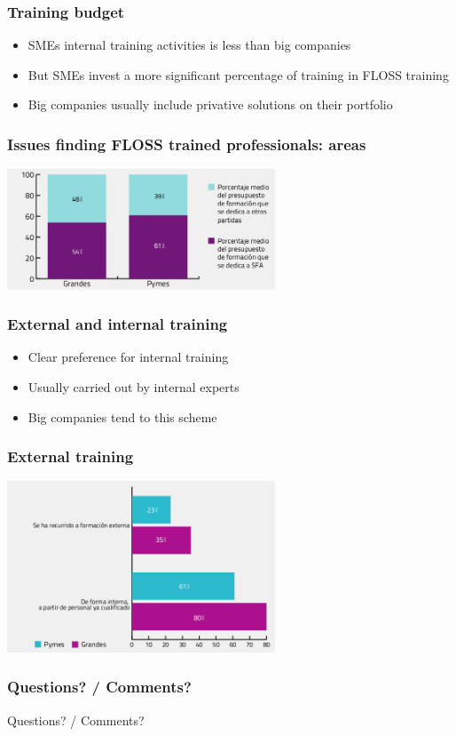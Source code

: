\documentclass{beamer}
\begin{document}
\begin{frame}
\frametitle{Training budget}
\begin{itemize}
\item SMEs internal training activities is less than big companies
\item But SMEs invest a more significant percentage of training in FLOSS training
\item Big companies usually include privative solutions on their portfolio
\end{itemize}
\end{frame}


\begin{frame}
\frametitle{Issues finding FLOSS trained professionals: areas}
\begin{center}
  \includegraphics[width=8cm]{figs/cenatic_trainingbudget.png}
\end{center}
\end{frame}


\begin{frame}
\frametitle{External and internal training}
\begin{itemize}
\item Clear preference for internal training
\item Usually carried out by internal experts
\item Big companies tend to this scheme 
\end{itemize}
\end{frame}



\begin{frame}
\frametitle{External training}
\begin{center}
  \includegraphics[width=8cm]{figs/cenatic_externaltraining.png}
\end{center}
\end{frame}


\begin{frame}
\frametitle{Questions? / Comments?}
\begin{center}
\huge{Questions? / Comments?}
\end{center}
\end{frame}

\end{document}
